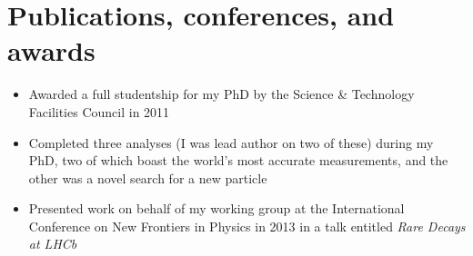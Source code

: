 \section{Publications, conferences, and awards}


\begin{itemize}
  \item Awarded a full studentship for my PhD by the Science \& Technology Facilities Council in
    2011
  \item Completed three analyses (I was lead author on two of these) during my PhD,
    two of which boast the world's most accurate measurements, and the other was a novel search
    for a new particle
  \item Presented work on behalf of my working group at the International Conference on New
    Frontiers in Physics in 2013 in a talk entitled \textit{Rare Decays at LHCb}
\end{itemize}







